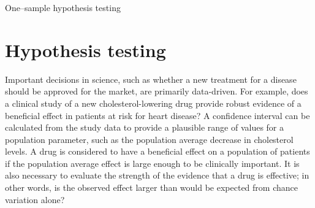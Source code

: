 \begin{chapterpage}{One--sample hypothesis testing}
  \label{ch:OneSampleHT}

\end{chapterpage}
\renewcommand{\chapterfolder}{ch_05a_inference_foundations_oi_biostat}


\section[Hypothesis testing]{Hypothesis testing} %
\label{hypothesisTesting}


Important decisions in science, such as whether a new treatment for a disease should be approved for the market, are primarily data-driven. For example, does a clinical study of a new cholesterol-lowering drug provide robust evidence of a beneficial effect in patients at risk for heart disease? A confidence interval can be calculated from the study data to provide a plausible range of values for a population parameter, such as the population average decrease in cholesterol levels. A drug is considered to have a beneficial effect on a population of patients if the population average effect is large enough to be clinically important. It is also necessary to evaluate the strength of the evidence that a drug is effective; in other words, is the observed effect larger than would be expected from chance variation alone?

